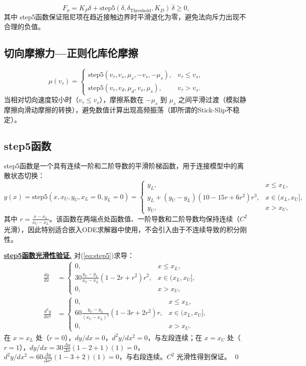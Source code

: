 \documentclass[10pt,a4paper]{book}
\theoremstyle{thmstyle}
\theoremstyle{defstyle}
\theoremstyle{prostyle}
\renewenvironment{proof}[1][证明]{\par{\kaishu \underline{\textbf{#1.}}} \;\fangsong}{\qed\par}
\begin{document}
\begin{equation}
F_\sigma = K_P\delta + \mathrm{step5}(\delta,\delta_{\text{Threshold}},K_D)\,\dot{\delta} \geq 0,
\label{eq:Fsigma}
\end{equation}
其中 step5函数保证阻尼项在趋近接触边界时平滑退化为零，避免法向斥力出现不合理的负值。

\subsection{切向摩擦力---正则化库伦摩擦}

\begin{equation}
\mu(v_\tau) =
\begin{cases}
\mathrm{step5}(v_\tau,v_s,\mu_s,-v_s,-\mu_s), & v_\tau \leq v_s,\\
\mathrm{step5}(v_\tau,v_d,\mu_d,v_s,\mu_s), & v_\tau > v_s.
\end{cases}
\label{eq:mu_v}
\end{equation}
当相对切向速度较小时（$v_\tau \leq v_s$），摩擦系数在 $-\mu_s$ 到 $\mu_s$ 之间平滑过渡（模拟静摩擦向滑动摩擦的转换），避免数值计算出现高频振荡（即所谓的Stick-Slip不稳定）。

\subsection{step5函数}

step5函数是一个具有连续一阶和二阶导数的平滑阶梯函数，用于连接模型中的离散状态切换：
\begin{equation}
y(x) = \mathrm{step5}(x,x_U,y_U,x_L=0,y_L=0) =
\begin{cases}
y_L, & x \leq x_L,\\
y_L + (y_U - y_L)(10 - 15r + 6r^2)r^3, & x \in (x_L,x_U],\\
y_U, & x > x_U,
\end{cases}
\label{eq:step5}
\end{equation}
其中 $r = \frac{x - x_L}{x_U - x_L}$。该函数在两端点处函数值、一阶导数和二阶导数均保持连续（$C^2$ 光滑），因此特别适合嵌入ODE求解器中使用，不会引入由于不连续导致的积分刚性。

\begin{proof}[step5函数光滑性验证]
  对(\ref{eq:step5})求导：
  \begin{align}
  \frac{dy}{dx} &=
  \begin{cases}
  0, & x\leq x_L,\\
  30\frac{y_U-y_L}{x_U-x_L}(1-2r+r^2)r^2, & x\in(x_L,x_U],\\
  0, & x>x_U,
  \end{cases} \\
  \frac{d^2y}{dx^2} &=
  \begin{cases}
  0, & x\leq x_L,\\
  60\frac{y_U-y_L}{(x_U-x_L)^2}(1-3r+2r^2)r, & x\in(x_L,x_U],\\
  0, & x>x_U.
  \end{cases}
  \end{align}
  在 $x=x_L$ 处（$r=0$），$dy/dx = 0$，$d^2y/dx^2 = 0$，与左段连续；在 $x=x_U$ 处（$r=1$），$dy/dx = 30\frac{\Delta y}{\Delta x}(1-2+1)(1)=0$，$d^2y/dx^2 = 60\frac{\Delta y}{\Delta x^2}(1-3+2)(1)=0$，与右段连续。$C^2$ 光滑性得到保证。
\end{proof}
\end{document}
